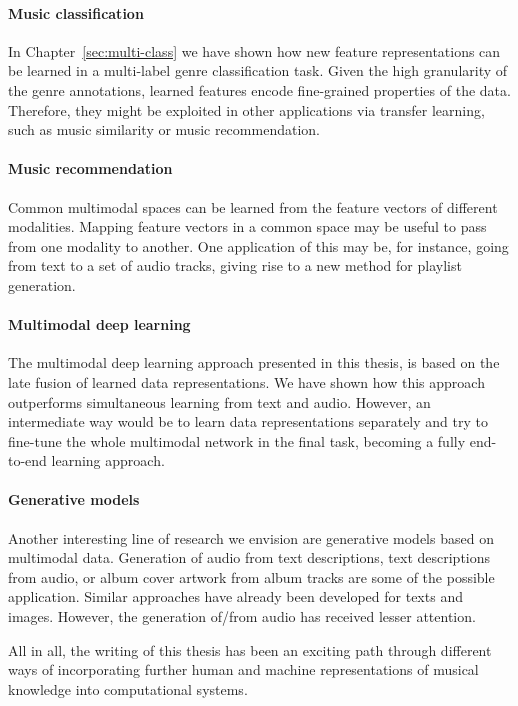 \paragraph{Music classification} In Chapter~\ref{sec:multi-class} we have shown how new feature representations can be learned in a multi-label genre classification task. Given the high granularity of the genre annotations, learned features encode fine-grained properties of the data. Therefore, they might be exploited in other applications via transfer learning, such as music similarity or music recommendation. 

\paragraph{Music recommendation} Common multimodal spaces can be learned from the feature vectors of different modalities. Mapping feature vectors in a common space may be useful to pass from one modality to another. One application of this may be, for instance, going from text to a set of audio tracks, giving rise to a new method for playlist generation.

\paragraph{Multimodal deep learning}
The multimodal deep learning approach presented in this thesis, is based on the late fusion of learned data representations. We have shown how this approach outperforms simultaneous learning from text and audio. However, an intermediate way would be to learn data representations separately and try to fine-tune the whole multimodal network in the final task, becoming a fully end-to-end learning approach.

\paragraph{Generative models} Another interesting line of research we envision are generative models based on multimodal data. Generation of audio from text descriptions, text descriptions from audio, or album cover artwork from album tracks are some of the possible application. Similar approaches have already been developed for texts and images. However, the generation of/from audio has received lesser attention.

\vspace{0.4cm}


All in all, the writing of this thesis has been an exciting path through different ways of incorporating further human and machine representations of musical knowledge into computational systems.